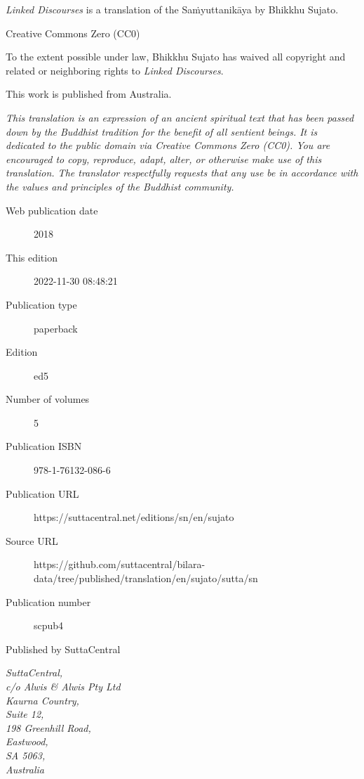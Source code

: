 \documentclass[12pt,openany]{book}%
\begin{document}
\begin{footnotesize}

\textit{Linked Discourses} is a translation of the Saṁyuttanikāya by Bhikkhu Sujato.

\medskip

Creative Commons Zero (CC0)

To the extent possible under law, Bhikkhu Sujato has waived all copyright and related or neighboring rights to \textit{Linked Discourses}.

\medskip

This work is published from Australia.

\begin{center}
\textit{This translation is an expression of an ancient spiritual text that has been passed down by the Buddhist tradition for the benefit of all sentient beings. It is dedicated to the public domain via Creative Commons Zero (CC0). You are encouraged to copy, reproduce, adapt, alter, or otherwise make use of this translation. The translator respectfully requests that any use be in accordance with the values and principles of the Buddhist community.}
\end{center}

\medskip

\begin{description}
    \item[Web publication date] 2018
    \item[This edition] 2022-11-30 08:48:21
    \item[Publication type] paperback
    \item[Edition] ed5
    \item[Number of volumes] 5
    \item[Publication ISBN] 978-1-76132-086-6
    \item[Publication URL] https://suttacentral.net/editions/sn/en/sujato
    \item[Source URL] https://github.com/suttacentral/bilara-data/tree/published/translation/en/sujato/sutta/sn
    \item[Publication number] scpub4
\end{description}

\medskip

Published by SuttaCentral

\medskip

\textit{SuttaCentral,\\
c/o Alwis \& Alwis Pty Ltd\\
Kaurna Country,\\
Suite 12,\\
198 Greenhill Road,\\
Eastwood,\\
SA 5063,\\
Australia}

\end{footnotesize}
\end{document}
